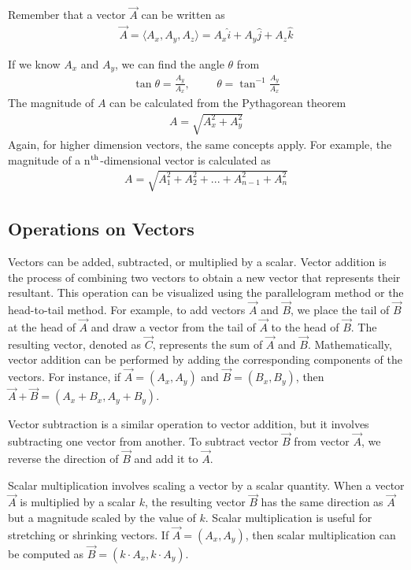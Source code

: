 \documentclass[11pt]{report}
\begin{document}
Remember that a vector $\Vec{A}$ can be written as
\begin{align*}
    \Vec{A} = \langle A_x, A_y, A_z \rangle = A_x \hat{i} + A_y \hat{j} + A_z \hat{k}
\end{align*}

If we know $A_{x}$ and $A_{y}$, we can find the angle $\theta$ from
\begin{align*}
    \tan{\theta} = \frac{A_y}{A_x},\hspace{1cm}\theta = \tan^{-1}\frac{A_y}{A_x}    
\end{align*}
The magnitude of $A$ can be calculated from the Pythagorean theorem
\begin{align*}
    A = \sqrt{A_{x}^{2} + A_{y}^{2}}
\end{align*}
Again, for higher dimension vectors, the same concepts apply. For example, the magnitude of a n$\textsuperscript{th}$-dimensional vector is calculated as
\begin{align*}
    A = \sqrt{A_{1}^{2} + A_{2}^{2} +... + A_{n-1}^{2} +A_{n}^{2}}
\end{align*}

\subsection{Operations on Vectors}

Vectors can be added, subtracted, or multiplied by a scalar. Vector addition is the process of combining two vectors to obtain a new vector that represents their resultant. This operation can be visualized using the parallelogram method or the head-to-tail method. For example, to add vectors \(\Vec{A}\) and \(\Vec{B}\), we place the tail of \(\Vec{B}\) at the head of \(\Vec{A}\) and draw a vector from the tail of \(\Vec{A}\) to the head of \(\Vec{B}\). The resulting vector, denoted as \(\Vec{C}\), represents the sum of \(\Vec{A}\) and \(\Vec{B}\). Mathematically, vector addition can be performed by adding the corresponding components of the vectors. For instance, if \(\Vec{A} = (A_x, A_y)\) and \(\Vec{B} = (B_x, B_y)\), then \(\Vec{A} + \Vec{B} = (A_x + B_x, A_y + B_y)\).

Vector subtraction is a similar operation to vector addition, but it involves subtracting one vector from another. To subtract vector \(\Vec{B}\) from vector \(\Vec{A}\), we reverse the direction of \(\Vec{B}\) and add it to \(\Vec{A}\). 

Scalar multiplication involves scaling a vector by a scalar quantity. When a vector \(\Vec{A}\) is multiplied by a scalar \(k\), the resulting vector \(\Vec{B}\) has the same direction as \(\Vec{A}\) but a magnitude scaled by the value of \(k\). Scalar multiplication is useful for stretching or shrinking vectors. If \(\Vec{A} = (A_x, A_y)\), then scalar multiplication can be computed as \(\Vec{B} = (k \cdot A_x, k \cdot A_y)\).
\end{document}

